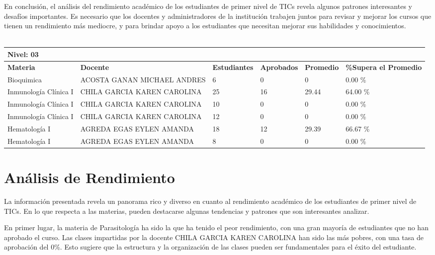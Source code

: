 En conclusión, el análisis del rendimiento académico de los estudiantes de primer nivel de TICs revela algunos patrones interesantes y desafíos importantes. Es necesario que los docentes y administradores de la institución trabajen juntos para revisar y mejorar los cursos que tienen un rendimiento más mediocre, y para brindar apoyo a los estudiantes que necesitan mejorar sus habilidades y conocimientos.\\
\vspace{1cm}\\\small
\begin{tabularx}{\textwidth}{|p{2.5cm}|p{2.5cm}|X|X|X|X|}
\hline
\multicolumn{6}{|X|}{\textbf{Nivel: 03 }}\\\hline\textbf{Materia} & \textbf{Docente} & \textbf{Estudiantes} & \textbf{Aprobados} & \textbf{Promedio} & \textbf{\%Supera el Promedio} \\ \hline
Bioquimica & ACOSTA GANAN MICHAEL ANDRES & 6 & 0 & 0 & 0.00 \%\\ \hline
Inmunología Clínica I & CHILA GARCIA KAREN CAROLINA & 25 & 16 & 29.44 & 64.00 \%\\ \hline
Inmunología Clínica I & CHILA GARCIA KAREN CAROLINA & 10 & 0 & 0 & 0.00 \%\\ \hline
Inmunología Clínica I & CHILA GARCIA KAREN CAROLINA & 12 & 0 & 0 & 0.00 \%\\ \hline
Hematología I & AGREDA EGAS EYLEN AMANDA & 18 & 12 & 29.39 & 66.67 \%\\ \hline
Hematología I & AGREDA EGAS EYLEN AMANDA & 8 & 0 & 0 & 0.00 \%\\ \hline
\end{tabularx}

\vspace{1cm}
\section{Análisis de Rendimiento}
La información presentada revela un panorama rico y diverso en cuanto al rendimiento académico de los estudiantes de primer nivel de TICs. En lo que respecta a las materias, pueden destacarse algunas tendencias y patrones que son interesantes analizar.

En primer lugar, la materia de Parasitología ha sido la que ha tenido el peor rendimiento, con una gran mayoría de estudiantes que no han aprobado el curso. Las clases impartidas por la docente CHILA GARCIA KAREN CAROLINA han sido las más pobres, con una tasa de aprobación del 0\%. Esto sugiere que la estructura y la organización de las clases pueden ser fundamentales para el éxito del estudiante.

